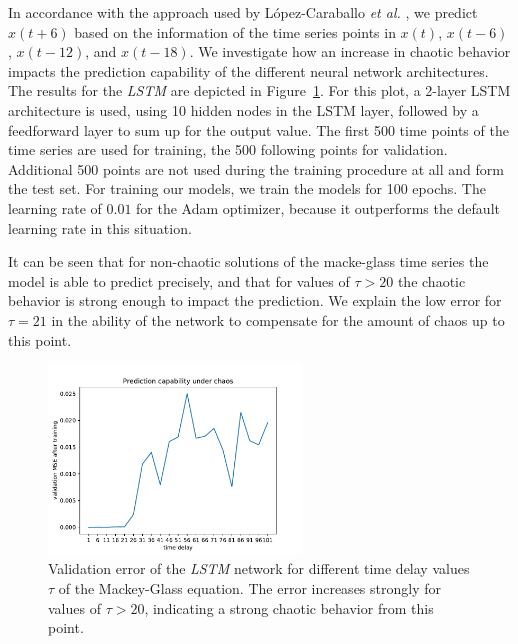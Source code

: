 In accordance with the approach used by López-Caraballo \textit{et al.}
\cite{lopez2016}, we predict $x(t+6)$ based on the information of the time
series points in $x(t)$, $x(t-6)$, $x(t-12)$, and $x(t-18)$. We investigate how
an increase in chaotic behavior impacts the prediction capability of the
different neural network architectures. The results for the \emph{LSTM}
are depicted in Figure~\ref{fig:mackey_lstm}. For this plot, a 2-layer
LSTM architecture is used, using 10 hidden nodes in the LSTM layer,
followed by a feedforward layer to sum up for the output value.
The first 500 time points of the time series are used for training, the 500
following points for validation. Additional 500 points are not used during the
training procedure at all and form the test set. For training our models, we 
train the models for 100 epochs. The learning rate of $0.01$ for the Adam 
optimizer, because it outperforms the default learning rate in this situation.

It can be seen that for non-chaotic solutions of the macke-glass time series the
model is able to predict precisely, and that for values of $\tau > 20$ the
chaotic behavior is strong enough to impact the prediction. We explain the low
error for $\tau = 21$ in the ability of the network to compensate for the amount
of chaos up to this point.

\begin{figure}
    \centering 
    \includegraphics[width=0.6\textwidth]{figures/mackey_glass_lstm_fast.pdf}
    \caption{Validation error of the \emph{LSTM} network for different
        time delay values $\tau$ of the Mackey-Glass equation. The error increases
        strongly for values of $\tau > 20$, indicating a strong chaotic behavior
        from this point.}
    \label{fig:mackey_lstm}
\end{figure}

